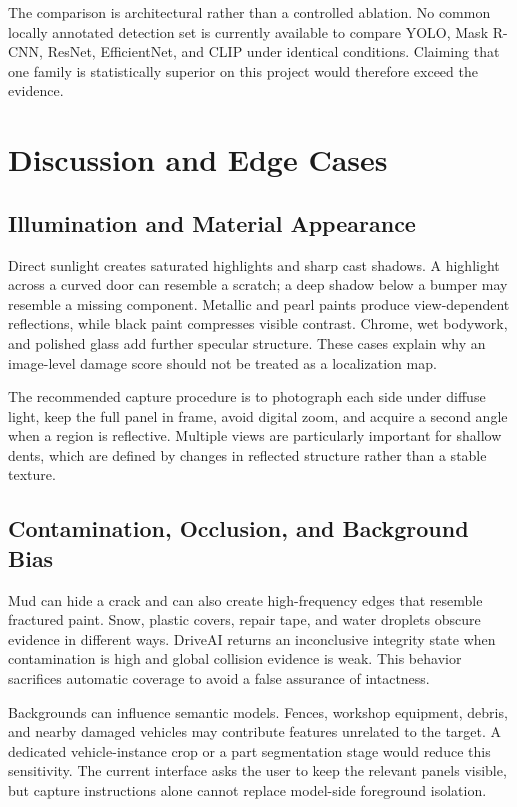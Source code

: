 \documentclass[conference]{IEEEtran}
\begin{document}
The comparison is architectural rather than a controlled ablation. No common locally annotated detection set is currently available to compare YOLO, Mask R-CNN, ResNet, EfficientNet, and CLIP under identical conditions. Claiming that one family is statistically superior on this project would therefore exceed the evidence.

\section{Discussion and Edge Cases}

\subsection{Illumination and Material Appearance}

Direct sunlight creates saturated highlights and sharp cast shadows. A highlight across a curved door can resemble a scratch; a deep shadow below a bumper may resemble a missing component. Metallic and pearl paints produce view-dependent reflections, while black paint compresses visible contrast. Chrome, wet bodywork, and polished glass add further specular structure. These cases explain why an image-level damage score should not be treated as a localization map.

The recommended capture procedure is to photograph each side under diffuse light, keep the full panel in frame, avoid digital zoom, and acquire a second angle when a region is reflective. Multiple views are particularly important for shallow dents, which are defined by changes in reflected structure rather than a stable texture.

\subsection{Contamination, Occlusion, and Background Bias}

Mud can hide a crack and can also create high-frequency edges that resemble fractured paint. Snow, plastic covers, repair tape, and water droplets obscure evidence in different ways. DriveAI returns an inconclusive integrity state when contamination is high and global collision evidence is weak. This behavior sacrifices automatic coverage to avoid a false assurance of intactness.

Backgrounds can influence semantic models. Fences, workshop equipment, debris, and nearby damaged vehicles may contribute features unrelated to the target. A dedicated vehicle-instance crop or a part segmentation stage would reduce this sensitivity. The current interface asks the user to keep the relevant panels visible, but capture instructions alone cannot replace model-side foreground isolation.
\end{document}

